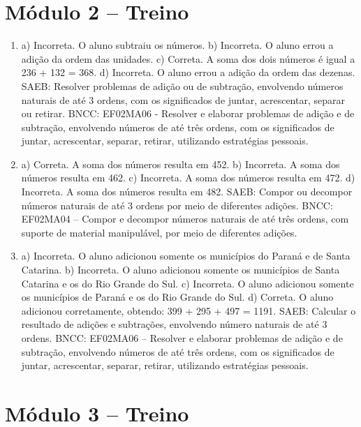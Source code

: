 \section*{Módulo 2 – Treino}

\begin{enumerate}
\item
a) Incorreta. O aluno subtraiu os números.
b) Incorreta. O aluno errou a adição da ordem das unidades.
c) Correta. A soma dos dois números é igual a 236 + 132 = 368.
d) Incorreta. O aluno errou a adição da ordem das dezenas.
SAEB: Resolver problemas de adição ou de subtração, envolvendo
números naturais de até 3 ordens, com os significados de juntar,
acrescentar, separar ou retirar.
BNCC: EF02MA06 - Resolver e elaborar problemas de adição e de subtração, envolvendo números de até três ordens, com os significados de juntar, acrescentar, separar,
retirar, utilizando estratégias pessoais.

\item
a) Correta. A soma dos números resulta em 452.
b) Incorreta. A soma dos números resulta em 462.
c) Incorreta. A soma dos números resulta em 472.
d) Incorreta. A soma dos números resulta em 482.
SAEB: Compor ou decompor números naturais de até 3 ordens por
meio de diferentes adições.
BNCC: EF02MA04 -- Compor e decompor números naturais de até três ordens,
com suporte de material manipulável, por meio de diferentes adições.

\item
a) Incorreta. O aluno adicionou somente os municípios do Paraná e de Santa Catarina.
b) Incorreta. O aluno adicionou somente os municípios de Santa Catarina e os do Rio Grande do Sul.
c) Incorreta. O aluno adicionou somente os municípios de Paraná e os do Rio Grande do Sul.
d) Correta. O aluno adicionou corretamente, obtendo: 399 + 295 + 497 = 1191.
SAEB: Calcular o resultado de adições e subtrações, envolvendo número naturais de até 3 ordens.
BNCC: EF02MA06 -- Resolver e elaborar problemas de adição e de subtração,
envolvendo números de até três ordens, com os significados de juntar, acrescentar, separar,
retirar, utilizando estratégias pessoais.
\end{enumerate}

\section*{Módulo 3 – Treino}

